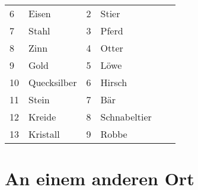 \documentclass[final]{multiversum}
\begin{document}
\begin{table*}[!t]
\begin{framed}
\begin{tabular}{p{}p{}p{}p{}p{}p{}}
6             & Eisen                          & 2               & Stier                                       \\
7             & Stahl                          & 3               & Pferd                                       \\
8             & Zinn                           & 4               & Otter                                       \\
9             & Gold                           & 5               & Löwe                                        \\
10            & Quecksilber                    & 6               & Hirsch                                      \\
11            & Stein                          & 7               & Bär                                         \\
12            & Kreide                         & 8               & Schnabeltier                                \\
13            & Kristall                       & 9               & Robbe                                       \\
\end{tabular}
\end{framed}
\end{table*}

\section{An einem anderen Ort}
\end{document}
